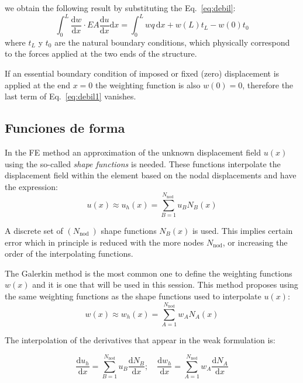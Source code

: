 \documentclass[spanish,a4paper,12pt]{article}
\begin{document}
we obtain the following result by substituting the Eq.~\eqref{eq:debil}:
\begin{equation}\label{eq:debil1}
\int_{0}^{L} \frac{\mathrm{d} w}{\mathrm{d} x} \cdot EA \frac{\mathrm{d} u}{\mathrm{d} x} \mathrm{d} x=\int_{0}^{L} w q \,\mathrm{d} x+w(L) t_{L}-w(0) t_{0}
\end{equation}
where $t_{L}$ y $t_{0}$ are the natural boundary conditions, which physically correspond to the forces applied at the two ends of the structure.

If an essential boundary condition of imposed or fixed (zero) displacement is applied at the end $x=0$ the weighting function is also $w(0)=0$, therefore the last term of Eq.~\eqref{eq:debil1} vanishes.

\subsection{Funciones de forma}
\label{sec:N}
In the FE method an approximation of the unknown displacement field $u(x)$ using the so-called \textit{shape functions} is needed. These functions interpolate the displacement field within the element based on the nodal displacements and have the expression:
\begin{equation}\label{eq:N1}
u(x) \approx u_{h}(x)=\sum_{B=1}^{N_{\text {nod }}} u_{B} N_{B}(x)
\end{equation}

A discrete set of $\left(N_{\text {nod }}\right)$ shape functions $N_{B}(x)$ is used. This implies certain error which in principle is reduced with the more nodes $N_{\text {nod}}$, or increasing the order of the interpolating functions.

The Galerkin method is the most common one to define the weighting functions $w(x)$ and it is one that will be used in this session. This method proposes using the same weighting functions as the shape functions used to interpolate $u(x)$:
\begin{equation}\label{eq:N2}
w(x) \approx w_{h}(x)=\sum_{A=1}^{N_{\mathrm{nod}}} w_{A} N_{A}(x)
\end{equation}

The interpolation of the derivatives that appear in the weak formulation is:


\begin{equation}\label{eq:N3}
\frac{\mathrm{d} u_{h}}{\mathrm{d} x}=\sum_{B=1}^{N_{\mathrm{nod}}} u_{B} \frac{\mathrm{d} N_{B}}{\mathrm{d} x} ; \quad \frac{\mathrm{d} w_{h}}{\mathrm{d} x}=\sum_{A=1}^{N_{\mathrm{nod}}} w_{A} \frac{\mathrm{d} N_{A}}{\mathrm{d} x}
\end{equation}
\end{document}
